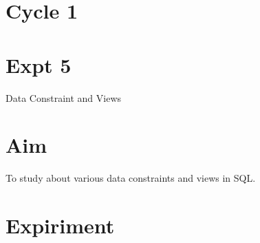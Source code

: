 \documentclass[13pt,oneside]{book}
\begin{document}
\section*{Cycle 1}
\section*{Expt 5}
\begin{center}
    \Large{Data Constraint and Views}
\end{center}

\section*{Aim}
\large To study about various data constraints and views in SQL.

\section*{Expiriment}
\end{document}
